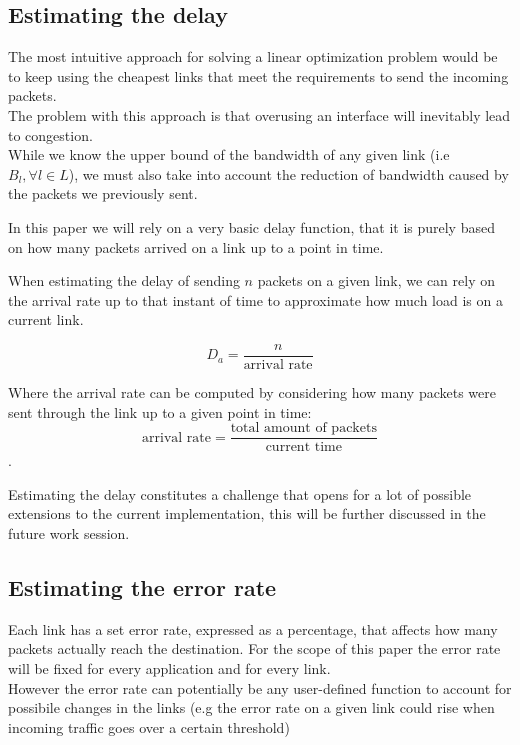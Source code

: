 \subsection{Estimating the delay} \label{estimating_the_delay}

The most intuitive approach for solving a linear optimization problem would be to keep using the cheapest links that meet the requirements to send the incoming packets. \\
The problem with this approach is that overusing an interface will inevitably lead to congestion. \\ While we know the upper bound of the bandwidth of any given link (i.e $B_l, \forall l \in L$), we must also take into account the reduction of bandwidth caused by the packets we previously sent.

In this paper we will rely on a very basic delay function, that it is purely based on how many packets arrived on a link up to a point in time.

When estimating the delay of sending $n$ packets on a given link, we can rely on the arrival rate up to that instant of time to approximate how much load is on a current link.

\[
	D_a =  \frac {n} {\text{arrival rate}}
\]

Where the arrival rate can be computed by considering how many packets were sent through the link up to a given point in time:
\[
	\text{arrival rate} = \frac {\text{total amount of packets}} {\text{current time}}
\].

Estimating the delay constitutes a challenge that opens for a lot of possible extensions to the current implementation, this will be further discussed in the future work session.


\subsection{Estimating the error rate} \label{estimating_the_error_rate}

Each link has a set error rate, expressed as a percentage, that affects how many packets actually reach the destination. For the scope of this paper the error rate will be fixed for every application and for every link. \\
However the error rate can potentially be any user-defined function to account for possibile changes in the links (e.g the error rate on a given link could rise when incoming traffic goes over a certain threshold)